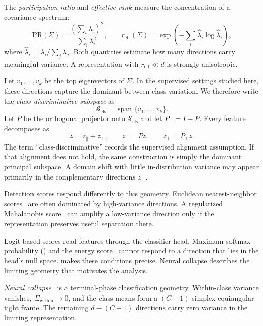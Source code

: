 \begin{definition}
The \emph{participation ratio} and \emph{effective rank} measure the concentration
of a covariance spectrum:
\[
  \mathrm{PR}(\Sigma)
  =\frac{(\sum_i\lambda_i)^2}{\sum_i\lambda_i^2},
  \qquad
  r_{\mathrm{eff}}(\Sigma)
  =\exp\!\left(-\sum_i\hat{\lambda}_i\log\hat{\lambda}_i\right),
\]
where $\hat{\lambda}_i=\lambda_i/\sum_j\lambda_j$. Both quantities estimate how
many directions carry meaningful variance. A representation with
$r_{\mathrm{eff}}\ll d$ is strongly anisotropic.
\label{def:bg:anisotropy}
\end{definition}

\begin{definition}
Let $v_1,\ldots,v_k$ be the top eigenvectors of $\Sigma$. In the supervised
settings studied here, these directions capture the dominant between-class
variation. We therefore write the \emph{class-discriminative subspace} as
\[
  \mathcal{S}_{\mathrm{cls}}
  =\operatorname{span}\{v_1,\ldots,v_k\}.
\]
Let $P$ be the orthogonal projector onto $\mathcal{S}_{\mathrm{cls}}$ and let
$P_\perp=I-P$. Every feature decomposes as
\[
  z=z_\parallel+z_\perp,
  \qquad z_\parallel=Pz,
  \qquad z_\perp=P_\perp z.
\]
The term ``class-discriminative'' records the supervised alignment assumption. If
that alignment does not hold, the same construction is simply the dominant
principal subspace. A domain shift with little in-distribution variance may appear
primarily in the complementary directions $z_\perp$.
\label{def:bg:clssubspace}
\end{definition}

Detection scores respond differently to this geometry. Euclidean
nearest-neighbor scores~\citep{sun2022out} are often dominated by high-variance
directions. A regularized Mahalanobis score~\citep{lee2018simple} can amplify a
low-variance direction only if the representation preserves useful separation
there.

Logit-based scores read features through the classifier head. Maximum softmax
probability () and the energy score~\citep{liu2020energy}
cannot respond to a direction that lies in the head's null space.
 makes these conditions precise. Neural
collapse describes the limiting geometry that motivates the analysis.

\begin{definition}
\emph{Neural collapse}~\citep{Papyan2020nc} is a terminal-phase classification
geometry. Within-class variance vanishes,
$\Sigma_{\mathrm{within}}\to0$, and the class means form a
$(C-1)$-simplex equiangular tight frame. The remaining $d-(C-1)$ directions carry
zero variance in the limiting representation.
\label{def:bg:neuralcollapse}
\end{definition}

